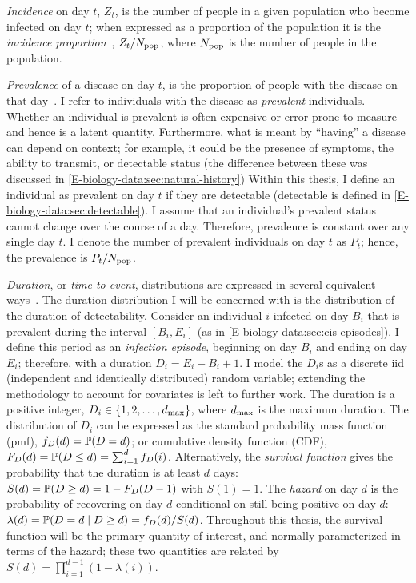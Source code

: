 \documentclass[thesis.tex]{subfiles}
\begin{document}
\emph{Incidence} on day $t$, $Z_t$, is the number of people in a given population who become infected on day $t$; when expressed as a proportion of the population it is the \emph{incidence proportion}~\autocite[89]{lashModern}, $Z_t/N_\text{pop}$, where $N_\text{pop}$ is the number of people in the population.

\emph{Prevalence} of a disease on day $t$, is the proportion of people with the disease on that day~\autocite[90]{lashModern}.
I refer to individuals with the disease as \emph{prevalent} individuals.
Whether an individual is prevalent is often expensive or error-prone to measure and hence is a latent quantity.
Furthermore, what is meant by ``having'' a disease can depend on context; for example, it could be the presence of symptoms, the ability to transmit, or detectable status (the difference between these was discussed in \cref{E-biology-data:sec:natural-history})
Within this thesis, I define an individual as prevalent on day $t$ if they are detectable (detectable is defined in \cref{E-biology-data:sec:detectable}).
I assume that an individual's prevalent status cannot change over the course of a day.
Therefore, prevalence is constant over any single day $t$.
I denote the number of prevalent individuals on day $t$ as $P_t$; hence, the prevalence is $P_t/N_\text{pop}$.

\emph{Duration}, or \emph{time-to-event}, distributions are expressed in several equivalent ways~\autocite[17]{sunStatisticala}.
The duration distribution I will be concerned with is the distribution of the duration of detectability.
Consider an individual $i$ infected on day $B_i$ that is prevalent during the interval $[B_i, E_i]$ (as in \cref{E-biology-data:sec:cis-episodes}).
I define this period as an \emph{infection episode}, beginning on day $B_i$ and ending on day $E_i$; therefore, with a duration $D_i = E_i - B_i + 1$.
I model the $D_i$s as a discrete iid (independent and identically distributed) random variable; extending the methodology to account for covariates is left to further work.
The duration is a positive integer, \ie $D_i \in \{1, 2, \dots, d_\text{max} \}$, where $d_\text{max}$ is the maximum duration.
The distribution of $D_i$ can be expressed as the standard probability mass function (pmf), $f_{D}(d) = \operatorname{\mathbb{P}}(D = d)$; or cumulative density function (CDF), $F_{D}(d) = \operatorname{\mathbb{P}}(D \leq d) = \sum_{i=1}^d f_{D}(i)$.
Alternatively, the \emph{survival function} gives the probability that the duration is at least $d$ days: $S(d) = \operatorname{\mathbb{P}}(D \geq d) = 1 - F_{D}(D - 1)$ with $S(1) = 1$.
The \emph{hazard} on day $d$ is the probability of recovering on day $d$ conditional on still being positive on day $d$: $\lambda(d) = \operatorname{\mathbb{P}}(D = d \mid D \geq d) = f_{D}(d) / S(d)$.
Throughout this thesis, the survival function will be the primary quantity of interest, and normally parameterized in terms of the hazard; these two quantities are related by $S(d) = \prod_{i=1}^{d-1} (1 - \lambda(i))$.
\end{document}
